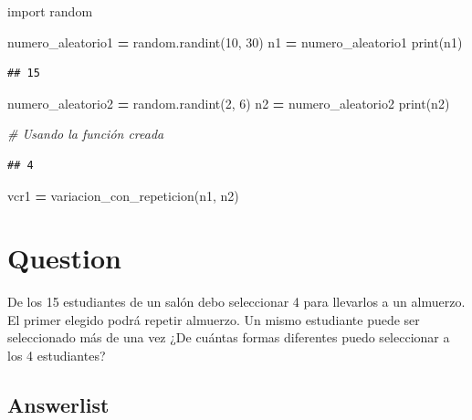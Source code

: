 \documentclass[
]{article}
\author{}
\date{\vspace{-2.5em}}
\newenvironment{Shaded}{\begin{snugshade}}{\end{snugshade}}
\newcommand{\BuiltInTok}[1]{#1}
\newcommand{\CommentTok}[1]{\textcolor[rgb]{0.56,0.35,0.01}{\textit{#1}}}
\newcommand{\DecValTok}[1]{\textcolor[rgb]{0.00,0.00,0.81}{#1}}
\newcommand{\ImportTok}[1]{#1}
\newcommand{\NormalTok}[1]{#1}
\newcommand{\OperatorTok}[1]{\textcolor[rgb]{0.81,0.36,0.00}{\textbf{#1}}}
\begin{document}
\begin{Shaded}
\begin{Highlighting}[]
\ImportTok{import}\NormalTok{ random}

\NormalTok{numero\_aleatorio1 }\OperatorTok{=}\NormalTok{ random.randint(}\DecValTok{10}\NormalTok{, }\DecValTok{30}\NormalTok{)}
\NormalTok{n1 }\OperatorTok{=}\NormalTok{ numero\_aleatorio1}
\BuiltInTok{print}\NormalTok{(n1)}
\end{Highlighting}
\end{Shaded}

\begin{verbatim}
## 15
\end{verbatim}

\begin{Shaded}
\begin{Highlighting}[]
\NormalTok{numero\_aleatorio2 }\OperatorTok{=}\NormalTok{ random.randint(}\DecValTok{2}\NormalTok{, }\DecValTok{6}\NormalTok{)}
\NormalTok{n2 }\OperatorTok{=}\NormalTok{ numero\_aleatorio2}
\BuiltInTok{print}\NormalTok{(n2)}

\CommentTok{\# Usando la función creada}
\end{Highlighting}
\end{Shaded}

\begin{verbatim}
## 4
\end{verbatim}

\begin{Shaded}
\begin{Highlighting}[]
\NormalTok{vcr1 }\OperatorTok{=}\NormalTok{ variacion\_con\_repeticion(n1, n2)}
\end{Highlighting}
\end{Shaded}

\hypertarget{question}{%
\section{Question}\label{question}}

\hfill\break
De los 15 estudiantes de un salón debo seleccionar 4 para llevarlos a un
almuerzo. El primer elegido podrá repetir almuerzo. Un mismo estudiante
puede ser seleccionado más de una vez ¿De cuántas formas diferentes
puedo seleccionar a los 4 estudiantes?

\hypertarget{answerlist}{%
\subsection{Answerlist}\label{answerlist}}
\end{document}

